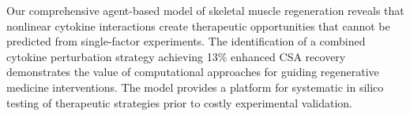 \documentclass[11pt]{article}
\begin{document}
Our comprehensive agent-based model of skeletal muscle regeneration reveals that nonlinear cytokine interactions create therapeutic opportunities that cannot be predicted from single-factor experiments. The identification of a combined cytokine perturbation strategy achieving 13\% enhanced CSA recovery demonstrates the value of computational approaches for guiding regenerative medicine interventions. The model provides a platform for systematic in silico testing of therapeutic strategies prior to costly experimental validation.



\end{document}

